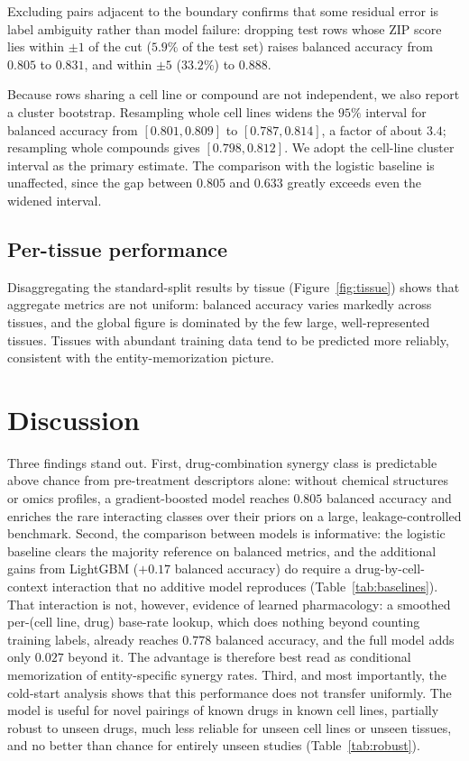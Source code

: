 \documentclass{bmcart}
\begin{document}
Excluding pairs adjacent to the boundary confirms that some residual error is label ambiguity rather
than model failure: dropping test rows whose ZIP score lies within $\pm 1$ of the cut ($5.9\%$ of the
test set) raises balanced accuracy from $0.805$ to $0.831$, and within $\pm 5$ ($33.2\%$) to $0.888$.

Because rows sharing a cell line or compound are not independent, we also report a cluster bootstrap.
Resampling whole cell lines widens the $95\%$ interval for balanced accuracy from
$[0.801,0.809]$ to $[0.787,0.814]$, a factor of about $3.4$; resampling whole compounds gives
$[0.798,0.812]$. We adopt the cell-line cluster interval as the primary estimate. The comparison with
the logistic baseline is unaffected, since the gap between $0.805$ and $0.633$ greatly exceeds even the
widened interval.

\subsection*{Per-tissue performance}
Disaggregating the standard-split results by tissue (Figure~\ref{fig:tissue}) shows that aggregate
metrics are not uniform: balanced accuracy varies markedly across tissues, and the global figure is
dominated by the few large, well-represented tissues. Tissues with abundant training data tend to be
predicted more reliably, consistent with the entity-memorization picture.

\section*{Discussion}
Three findings stand out. First, drug-combination synergy class is predictable above chance from
pre-treatment descriptors alone: without chemical structures or omics profiles, a gradient-boosted
model reaches $0.805$ balanced accuracy and enriches the rare interacting classes over their priors on
a large, leakage-controlled benchmark. Second, the comparison between models is informative: the
logistic baseline clears the majority reference on balanced metrics, and the additional gains from
LightGBM ($+0.17$ balanced accuracy) do require a drug-by-cell-context interaction that no additive
model reproduces (Table~\ref{tab:baselines}). That interaction is not, however, evidence of learned
pharmacology: a smoothed per-(cell line, drug) base-rate lookup, which does nothing beyond counting
training labels, already reaches $0.778$ balanced accuracy, and the full model adds only $0.027$ beyond
it. The advantage is therefore best read as conditional memorization of entity-specific synergy rates.
Third, and most importantly, the cold-start analysis shows that this
performance does not transfer uniformly. The model is useful for novel pairings of known drugs in
known cell lines, partially robust to unseen drugs, much less reliable for unseen cell lines or unseen
tissues, and no better than chance for entirely unseen studies (Table~\ref{tab:robust}).
\end{document}
